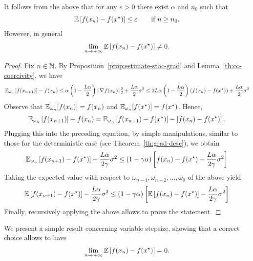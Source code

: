 \documentclass{report}
\begin{document}
\begin{remark}
	It follows from the above that for any $\varepsilon>0$ there exist $\alpha$ and $n_0$ such that 
	\begin{equation}
		\mathbb{E}\left[ f(x_n)-f(x^\star) \right] \le \varepsilon \qquad \text{if }n\ge n_0.
	\end{equation}
	However, in general 
	\begin{equation}
		\lim_{n\to +\infty} \mathbb{E}\left[ f(x_n)-f(x^\star) \right] \neq 0.
	\end{equation}
\end{remark}

\begin{proof}
	Fix $n\in\mathbb{N}$. 
	By Proposition~\ref{prop:estimate-stoc-grad} and Lemma~\ref{th:co-coercivity}, we have 
	\begin{equation}
		\mathbb{E}_{\omega_n}\left[ f(x_{n+1}) \right] -f(x_n)
		\le	\alpha\left( 1 - \frac{L\alpha}{2}\right)\|\nabla f(x_n)\|_2^2+\frac{L\alpha}{2}\sigma^2
		\le	2L\alpha\left( 1 - \frac{L\alpha}{2}\right)(f(x_n)-f(x^\star))+\frac{L\alpha}{2}\sigma^2
	\end{equation}
	Observe that $\mathbb{E}_{\omega_n}[f(x_n)]=f(x_n)$ and $\mathbb{E}_{\omega_n}[f(x^\star)]=f(x^\star)$. Hence, 
	\begin{equation}
		\mathbb{E}_{\omega_n}\left[ f(x_{n+1}) \right] -f(x_n) = \mathbb{E}_{\omega_n}\left[ f(x_{n+1}) -f(x^\star)\right] -\left[f(x_n) - f(x^\star) \right].
	\end{equation}
	Plugging this into the preceding equation, by simple manipulations, similar to those for the deterministic case (see Theorem~\ref{th:grad-desc}), we obtain
	\begin{equation}
		\mathbb{E}_{\omega_n}\left[ f(x_{n+1}) -f(x^\star)\right]	-\frac{L\alpha}{2\gamma} \sigma^2 \le (1-\gamma\alpha)\left[  f(x_{n}) -f(x^\star)	-\frac{L\alpha}{2\gamma} \sigma^2 \right]
	\end{equation}
	Taking the expected value with respect to $\omega_{n-1}, \omega_{n-2},\ldots, \omega_0$ of the above yield 
	\begin{equation}
		\label{eq:ciao}
		\mathbb{E}\left[ f(x_{n+1}) -f(x^\star)\right]	-\frac{L\alpha}{2\gamma} \sigma^2 \le (1-\gamma\alpha)\left[  \mathbb{E}\left[f(x_{n}) -f(x^\star)\right]	-\frac{L\alpha}{2\gamma} \sigma^2 \right]
	\end{equation}
	Finally, recursively applying the above allows to prove the statement.
\end{proof}

We present a simple result concerning variable stepsize, showing that a correct choice allows to have
\begin{equation}
	\lim_{n\to +\infty} \mathbb{E}\left[ f(x_n)-f(x^\star) \right] = 0.	
\end{equation}
\end{document}
